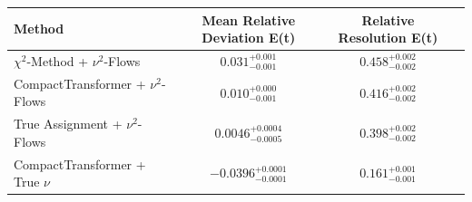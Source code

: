     \begin{tabular}{lccc}
        \toprule
        Method & Mean Relative Deviation E(t) & Relative Resolution E(t) \\
        \midrule
        $\chi^2$-Method + $\nu^2$-Flows & $0.031_{-0.001}^{+0.001}$ & $0.458_{-0.002}^{+0.002}$ \\
        CompactTransformer + $\nu^2$-Flows & $0.010_{-0.001}^{+0.000}$ & $0.416_{-0.002}^{+0.002}$ \\
        True Assignment + $\nu^2$-Flows & $0.0046_{-0.0005}^{+0.0004}$ & $0.398_{-0.002}^{+0.002}$ \\
        CompactTransformer + True $\nu$ & $-0.0396_{-0.0001}^{+0.0001}$ & $0.161_{-0.001}^{+0.001}$ \\
        \bottomrule
    \end{tabular}